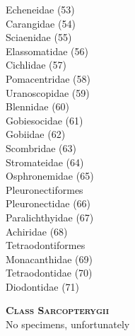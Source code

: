 \documentclass[12pt, hidelinks]{exam}
\newcommand{\onedent}{\hspace*{1em}}
\newcommand{\twodent}{\hspace*{2em}}
\begin{document}
\begin{multicols}{2}
\twodent Echeneidae (53)\\
\twodent Carangidae (54)\\
\twodent Sciaenidae (55)\\
\twodent Elassomatidae (56)\\
\twodent Cichlidae (57)\\
\twodent Pomacentridae (58)\\
\twodent Uranoscopidae (59)\\
\twodent Blennidae (60)\\
\twodent Gobiesocidae (61)\\
\twodent Gobiidae (62)\\
\twodent Scombridae (63)\\
\twodent Stromateidae (64)\\
\twodent Osphronemidae (65)\\
\onedent Pleuronectiformes\\
\twodent Pleuronectidae (66)\\
\twodent Paralichthyidae (67)\\
\twodent Achiridae (68)\\
\onedent Tetraodontiformes\\
\twodent Monacanthidae (69)\\
\twodent Tetraodontidae (70)\\
\twodent Diodontidae (71)

\textbf{\textsc{Class Sarcopterygii}}\\
No specimens, unfortunately

\end{multicols}
\end{document}
